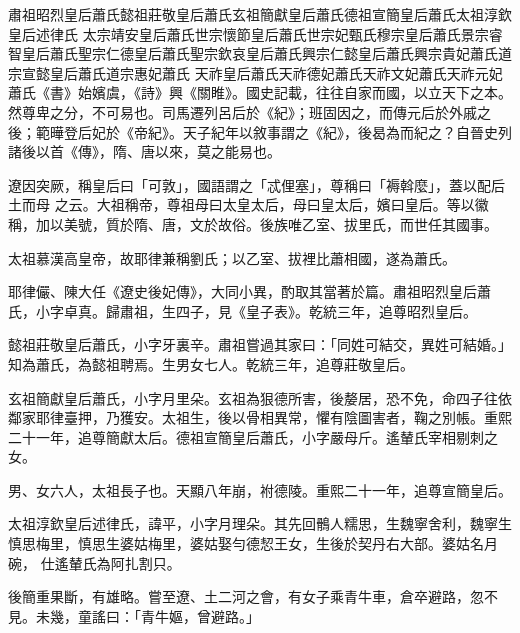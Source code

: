 
\begin{pinyinscope}

 肅祖昭烈皇后蕭氏懿祖莊敬皇后蕭氏玄祖簡獻皇后蕭氏德祖宣簡皇后蕭氏太祖淳欽皇后述律氏
 太宗靖安皇后蕭氏世宗懷節皇后蕭氏世宗妃甄氏穆宗皇后蕭氏景宗睿智皇后蕭氏聖宗仁德皇后蕭氏聖宗欽哀皇后蕭氏興宗仁懿皇后蕭氏興宗貴妃蕭氏道宗宣懿皇后蕭氏道宗惠妃蕭氏
 天祚皇后蕭氏天祚德妃蕭氏天祚文妃蕭氏天祚元妃蕭氏《書》始嬪虞，《詩》興《關睢》。國史記載，往往自家而國，以立天下之本。然尊卑之分，不可易也。司馬遷列呂后於《紀》；班固因之，而傳元后於外戚之後；範曄登后妃於《帝紀》。天子紀年以敘事謂之《紀》，後曷為而紀之？自晉史列諸後以首《傳》，隋、唐以來，莫之能易也。



 遼因突厥，稱皇后曰「可敦」，國語謂之「忒俚塞」，尊稱曰「褥斡麼」，蓋以配后土而母
 之云。大祖稱帝，尊祖母曰太皇太后，母曰皇太后，嬪曰皇后。等以徽稱，加以美號，質於隋、唐，文於故俗。後族唯乙室、拔里氏，而世任其國事。



 太祖慕漢高皇帝，故耶律兼稱劉氏；以乙室、拔裡比蕭相國，遂為蕭氏。



 耶律儼、陳大任《遼史後妃傳》，大同小異，酌取其當著於篇。肅祖昭烈皇后蕭氏，小字卓真。歸肅祖，生四子，見《皇子表》。乾統三年，追尊昭烈皇后。



 懿祖莊敬皇后蕭氏，小字牙裏辛。肅祖嘗過其家曰：「同姓可結交，異姓可結婚。」知為蕭氏，為懿祖聘焉。生男女七人。乾統三年，追尊莊敬皇后。



 玄祖簡獻皇后蕭氏，小字月里朵。玄祖為狠德所害，後嫠居，恐不免，命四子往依鄰家耶律臺押，乃獲安。太祖生，後以骨相異常，懼有陰圖害者，鞠之別帳。重熙二十一年，追尊簡獻太后。德祖宣簡皇后蕭氏，小字嚴母斤。遙輦氏宰相剔刺之女。



 男、女六人，太祖長子也。天顯八年崩，袝德陵。重熙二十一年，追尊宣簡皇后。



 太祖淳欽皇后述律氏，諱平，小字月理朵。其先回鶻人糯思，生魏寧舍利，魏寧生慎思梅里，慎思生婆姑梅里，婆姑娶勻德恝王女，生後於契丹右大部。婆姑名月碗，
 仕遙輦氏為阿扎割只。



 後簡重果斷，有雄略。嘗至遼、土二河之會，有女子乘青牛車，倉卒避路，忽不見。未幾，童謠曰：「青牛嫗，曾避路。」




\end{pinyinscope}
